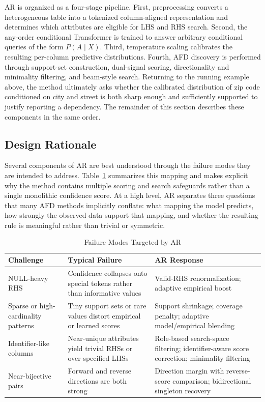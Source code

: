 \documentclass[conference]{IEEEtran}
\begin{document}
AR is organized as a four-stage pipeline. First, preprocessing converts a heterogeneous table into a tokenized column-aligned representation and determines which attributes are eligible for LHS and RHS search. Second, the any-order conditional Transformer is trained to answer arbitrary conditional queries of the form $P(A \mid X)$. Third, temperature scaling calibrates the resulting per-column predictive distributions. Fourth, AFD discovery is performed through support-set construction, dual-signal scoring, directionality and minimality filtering, and beam-style search. Returning to the running example above, the method ultimately asks whether the calibrated distribution of zip code conditioned on city and street is both sharp enough and sufficiently supported to justify reporting a dependency. The remainder of this section describes these components in the same order.

\subsection{Design Rationale}

Several components of AR are best understood through the failure modes they are intended to address. Table~\ref{tab:design_rationale} summarizes this mapping and makes explicit why the method contains multiple scoring and search safeguards rather than a single monolithic confidence score. At a high level, AR separates three questions that many AFD methods implicitly conflate: what mapping the model predicts, how strongly the observed data support that mapping, and whether the resulting rule is meaningful rather than trivial or symmetric.

\begin{table}[t]
\caption{Failure Modes Targeted by AR}
\label{tab:design_rationale}
\centering
\scriptsize
\begin{tabular}{p{1.75cm}p{2.35cm}p{2.75cm}}
\toprule
\textbf{Challenge} & \textbf{Typical Failure} & \textbf{AR Response} \\
\midrule
NULL-heavy RHS & Confidence collapses onto special tokens rather than informative values & Valid-RHS renormalization; adaptive empirical boost \\
Sparse or high-cardinality patterns & Tiny support sets or rare values distort empirical or learned scores & Support shrinkage; coverage penalty; adaptive model/empirical blending \\
Identifier-like columns & Near-unique attributes yield trivial RHSs or over-specified LHSs & Role-based search-space filtering; identifier-aware score correction; minimality filtering \\
Near-bijective pairs & Forward and reverse directions are both strong & Direction margin with reverse-score comparison; bidirectional singleton recovery \\
\bottomrule
\end{tabular}
\end{table}
\end{document}
